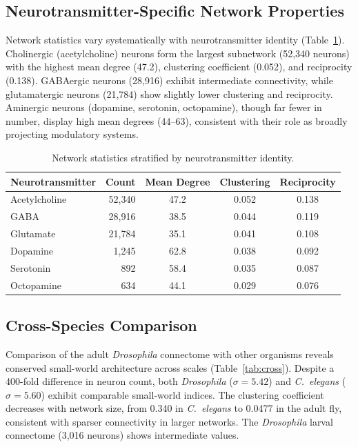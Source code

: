 \documentclass[11pt]{article}
\begin{document}
\subsection{Neurotransmitter-Specific Network Properties}

Network statistics vary systematically with neurotransmitter identity (Table~\ref{tab:nt}). Cholinergic (acetylcholine) neurons form the largest subnetwork (52,340 neurons) with the highest mean degree (47.2), clustering coefficient (0.052), and reciprocity (0.138). GABAergic neurons (28,916) exhibit intermediate connectivity, while glutamatergic neurons (21,784) show slightly lower clustering and reciprocity. Aminergic neurons (dopamine, serotonin, octopamine), though far fewer in number, display high mean degrees (44--63), consistent with their role as broadly projecting modulatory systems.

\begin{table}[ht]
\centering
\caption{Network statistics stratified by neurotransmitter identity.}
\label{tab:nt}
\begin{tabular}{@{}lrccc@{}}
\toprule
Neurotransmitter & Count & Mean Degree & Clustering & Reciprocity \\
\midrule
Acetylcholine & 52,340 & 47.2 & 0.052 & 0.138 \\
GABA & 28,916 & 38.5 & 0.044 & 0.119 \\
Glutamate & 21,784 & 35.1 & 0.041 & 0.108 \\
Dopamine & 1,245 & 62.8 & 0.038 & 0.092 \\
Serotonin & 892 & 58.4 & 0.035 & 0.087 \\
Octopamine & 634 & 44.1 & 0.029 & 0.076 \\
\bottomrule
\end{tabular}
\end{table}

\subsection{Cross-Species Comparison}

Comparison of the adult \textit{Drosophila} connectome with other organisms reveals conserved small-world architecture across scales (Table~\ref{tab:cross}). Despite a 400-fold difference in neuron count, both \textit{Drosophila} ($\sigma = 5.42$) and \textit{C.~elegans} ($\sigma = 5.60$) exhibit comparable small-world indices. The clustering coefficient decreases with network size, from 0.340 in \textit{C.~elegans} to 0.0477 in the adult fly, consistent with sparser connectivity in larger networks. The \textit{Drosophila} larval connectome (3,016 neurons) shows intermediate values.
\end{document}
